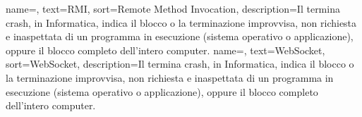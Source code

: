 {
	name=,
	text=RMI,
	sort=Remote Method Invocation,
	description={Il termina crash, in Informatica, indica il blocco o la terminazione improvvisa, non richiesta e inaspettata di un programma in esecuzione (sistema operativo o applicazione), oppure il blocco completo dell'intero computer. }
}
{
	name=,
	text=WebSocket,
	sort=WebSocket,
	description={Il termina crash, in Informatica, indica il blocco o la terminazione improvvisa, non richiesta e inaspettata di un programma in esecuzione (sistema operativo o applicazione), oppure il blocco completo dell'intero computer. }
}